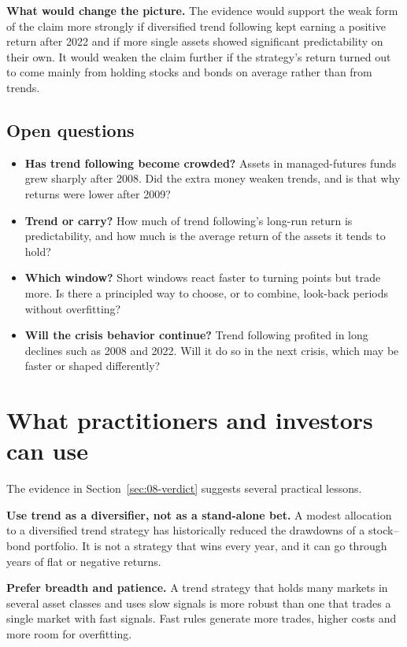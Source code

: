 \textbf{What would change the picture.} The evidence would support the weak form of the claim more strongly if diversified trend following kept earning a positive return after 2022 and if more single assets showed significant predictability on their own. It would weaken the claim further if the strategy's return turned out to come mainly from holding stocks and bonds on average rather than from trends.

\subsection{Open questions}
\label{sec:08-open}

\begin{itemize}
  \item \textbf{Has trend following become crowded?} Assets in managed-futures funds grew sharply after 2008. Did the extra money weaken trends, and is that why returns were lower after 2009?
  \item \textbf{Trend or carry?} How much of trend following's long-run return is predictability, and how much is the average return of the assets it tends to hold?
  \item \textbf{Which window?} Short windows react faster to turning points but trade more. Is there a principled way to choose, or to combine, look-back periods without overfitting?
  \item \textbf{Will the crisis behavior continue?} Trend following profited in long declines such as 2008 and 2022. Will it do so in the next crisis, which may be faster or shaped differently?
\end{itemize}

\section{What practitioners and investors can use}
\label{sec:08-investors}

The evidence in Section~\ref{sec:08-verdict} suggests several practical lessons.

\textbf{Use trend as a diversifier, not as a stand-alone bet.} A modest allocation to a diversified trend strategy has historically reduced the drawdowns of a stock--bond portfolio. It is not a strategy that wins every year, and it can go through years of flat or negative returns.

\textbf{Prefer breadth and patience.} A trend strategy that holds many markets in several asset classes and uses slow signals is more robust than one that trades a single market with fast signals. Fast rules generate more trades, higher costs and more room for overfitting.

